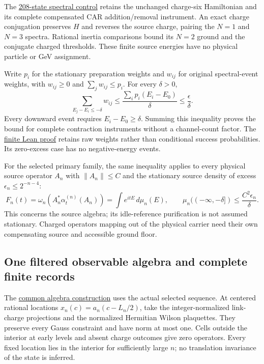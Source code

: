 The \href{https://github.com/FloatingPragma/observer-patch-holography/blob/main/model/particle_ground_spectral_records/PROOF.md}{208-state spectral control}
retains the unchanged charge-six Hamiltonian and its complete compensated
CAR addition/removal instrument. An exact charge conjugation preserves
$H$ and reverses the source charge, pairing the $N=1$ and $N=3$ spectra.
Rational inertia comparisons bound its $N=2$ ground and the conjugate
charged thresholds. These finite source energies have no physical
particle or GeV assignment.

Write $p_i$ for the stationary preparation weights and $w_{ij}$ for
original spectral-event weights, with $w_{ij}\ge0$ and
$\sum_jw_{ij}\le p_i$. For every $\delta>0$,
\[
 \sum_{E_j-E_i\le-\delta}w_{ij}
 \le\frac{\sum_i p_i(E_i-E_0)}{\delta}
 \le\frac{\epsilon}{\delta}.
\]
Every downward event requires $E_i-E_0\ge\delta$. Summing this inequality
proves the bound for complete contraction instruments without a
channel-count factor. The \href{https://github.com/FloatingPragma/observer-patch-holography/blob/main/Lean/QFT/GroundRecordTail.lean}{finite Lean proof}
retains raw weights rather than conditional success probabilities.
Its zero-excess case has no negative-energy events.

For the selected primary family, the same inequality applies to every
physical source operator $A_n$ with $\|A_n\|\le C$ and the stationary
source density of excess $\epsilon_n\le2^{-n-4}$:
\[
 F_n(t)=\omega_n(A_n^*\alpha_t^{(n)}(A_n))
       =\int e^{itE}\,d\mu_n(E),\qquad
 \mu_n(({-\infty},-\delta])\le\frac{C^2\epsilon_n}{\delta}.
\]
This concerns the source algebra; its idle-reference purification is not
assumed stationary. Charged operators mapping out of the physical carrier
need their own compensating source and accessible ground floor.

\subsection{One filtered observable algebra and complete finite records}
\label{sec:primary-filtered-algebra}

The \href{https://github.com/FloatingPragma/observer-patch-holography/blob/main/model/particle_primary_field_algebra/PROOF.md}{common algebra construction}
uses the actual selected sequence. At centered rational locations
$x_n(c)=a_n(c-L_n/2)$, take the integer-normalized link-charge projections
and the normalized Hermitian Wilson plaquettes. They preserve every Gauss
constraint and have norm at most one. Cells outside the interior at early
levels and absent charge outcomes give zero operators. Every fixed
location lies in the interior for sufficiently large $n$; no translation
invariance of the state is inferred.

